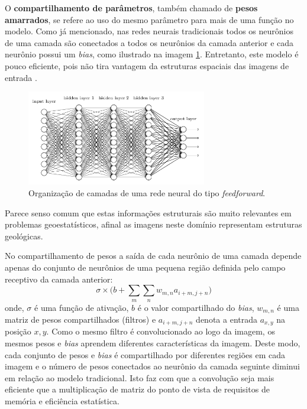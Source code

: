 O \textbf{compartilhamento de parâmetros}, também chamado de \textbf{pesos amarrados},
se refere ao uso do mesmo parâmetro para mais de uma função no modelo.
Como já mencionado, nas redes neurais tradicionais todos os neurônios de uma camada são conectados a todos os neurônios
da camada anterior e cada neurônio possui um \textit{bias}, como ilustrado na imagem \ref{fig:shallow}.
Entretanto, este modelo é pouco eficiente, pois não tira vantagem da estruturas espaciais das imagens
de entrada \citep{Gdfl16}.
\begin{figure}[htp]
\begin{center}
  \includegraphics[width=0.7\textwidth]{fig/shallow_nn}
  \caption{Organização de camadas de uma rede neural do tipo \textit{feedforward}.}
  \label{fig:shallow}
\end{center}
\end{figure}
Parece senso comum que estas informações estruturais são muito relevantes em problemas geoestatísticos, afinal as imagens
neste domínio representam estruturas geológicas.

No compartilhamento de pesos a saída de cada neurônio
de uma camada depende apenas do conjunto de neurônios de uma pequena região definida pelo campo receptivo da camada anterior:
\begin{equation}
 {\sigma} \times \bigg( b + \sum_{m}\sum_{n}{w_{m,n}a_{i+m,j+n} \bigg) }
\end{equation}
onde, $\sigma$ é uma função de ativação, $b$ é o valor compartilhado do \textit{bias}, $w_{m,n}$ é
uma matriz de pesos compartilhados (filtros) e $a_{i+m,j+n}$ denota a entrada $a_{x,y}$ na posição
$x,y$. Como o mesmo filtro é convolucionado ao logo da imagem,
os mesmos pesos e \textit{bias} aprendem diferentes características da imagem. Deste modo, cada conjunto de pesos e \textit{bias} é compartilhado
por diferentes regiões em cada imagem e o número de pesos conectados ao neurônio
da camada seguinte diminui em relação ao modelo tradicional. Isto faz com que a convolução seja mais eficiente que a multiplicação de matriz
do ponto de vista de requisitos de memória e eficiência estatística.

